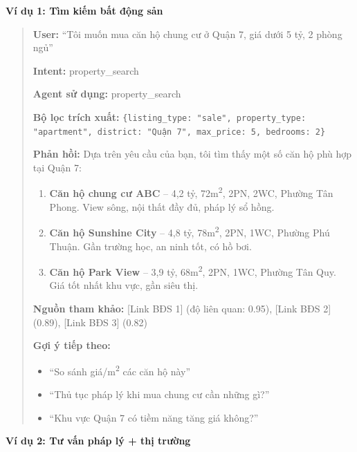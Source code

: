 \newpage


\vspace{0.3cm}

\textbf{Ví dụ 1: Tìm kiếm bất động sản}

\begin{quote}
\textbf{User:} ``Tôi muốn mua căn hộ chung cư ở Quận 7, giá dưới 5 tỷ, 2 phòng ngủ''

\textbf{Intent:} property\_search

\textbf{Agent sử dụng:} property\_search

\textbf{Bộ lọc trích xuất:} \texttt{\{listing\_type: "sale", property\_type: "apartment", district: "Quận 7", max\_price: 5, bedrooms: 2\}}

\textbf{Phản hồi:}
Dựa trên yêu cầu của bạn, tôi tìm thấy một số căn hộ phù hợp tại Quận 7:

\begin{enumerate}
    \item \textbf{Căn hộ chung cư ABC} -- 4,2 tỷ, 72m\textsuperscript{2}, 2PN, 2WC, Phường Tân Phong. View sông, nội thất đầy đủ, pháp lý sổ hồng.
    \item \textbf{Căn hộ Sunshine City} -- 4,8 tỷ, 78m\textsuperscript{2}, 2PN, 1WC, Phường Phú Thuận. Gần trường học, an ninh tốt, có hồ bơi.
    \item \textbf{Căn hộ Park View} -- 3,9 tỷ, 68m\textsuperscript{2}, 2PN, 1WC, Phường Tân Quy. Giá tốt nhất khu vực, gần siêu thị.
\end{enumerate}

\textbf{Nguồn tham khảo:} [Link BĐS 1] (độ liên quan: 0.95), [Link BĐS 2] (0.89), [Link BĐS 3] (0.82)

\textbf{Gợi ý tiếp theo:}
\begin{itemize}
    \item ``So sánh giá/m\textsuperscript{2} các căn hộ này''
    \item ``Thủ tục pháp lý khi mua chung cư cần những gì?''
    \item ``Khu vực Quận 7 có tiềm năng tăng giá không?''
\end{itemize}
\end{quote}

\vspace{0.5cm}

\textbf{Ví dụ 2: Tư vấn pháp lý + thị trường}


